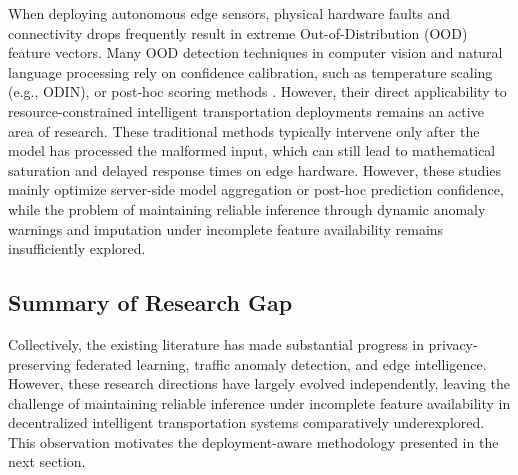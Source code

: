 When deploying autonomous edge sensors, physical hardware faults and connectivity drops frequently result in extreme Out-of-Distribution (OOD) feature vectors. Many OOD detection techniques in computer vision and natural language processing rely on confidence calibration, such as temperature scaling (e.g., ODIN), or post-hoc scoring methods \cite{liang2018enhancing}. However, their direct applicability to resource-constrained intelligent transportation deployments remains an active area of research. These traditional methods typically intervene only after the model has processed the malformed input, which can still lead to mathematical saturation and delayed response times on edge hardware. However, these studies mainly optimize server-side model aggregation or post-hoc prediction confidence, while the problem of maintaining reliable inference through dynamic anomaly warnings and imputation under incomplete feature availability remains insufficiently explored.

\subsection{Summary of Research Gap}

Collectively, the existing literature has made substantial progress in privacy-preserving federated learning, traffic anomaly detection, and edge intelligence. However, these research directions have largely evolved independently, leaving the challenge of maintaining reliable inference under incomplete feature availability in decentralized intelligent transportation systems comparatively underexplored. This observation motivates the deployment-aware methodology presented in the next section.
